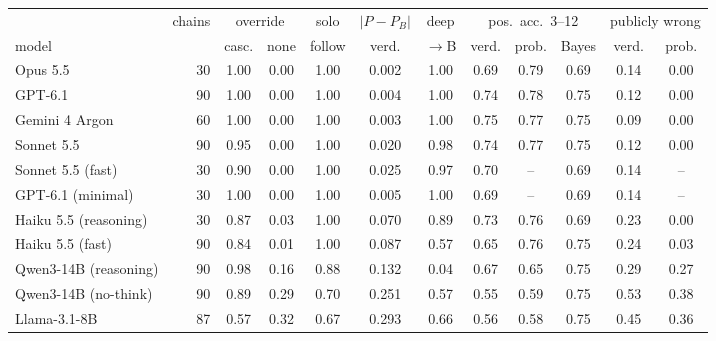\begin{tabular}{lrcccccccccc}
\toprule
 & chains & \multicolumn{2}{c}{override} & solo & $|P-P_B|$ & deep & \multicolumn{3}{c}{pos.\ acc.\ 3--12} & \multicolumn{2}{c}{publicly wrong} \\
\cmidrule(lr){3-4}\cmidrule(lr){8-10}\cmidrule(lr){11-12}
model & & casc. & none & follow & verd. & $\to$B & verd. & prob. & Bayes & verd. & prob. \\
\midrule
Opus 5.5 & 30 & 1.00 & 0.00 & 1.00 & 0.002 & 1.00 & 0.69 & 0.79 & 0.69 & 0.14 & 0.00 \\
GPT-6.1 & 90 & 1.00 & 0.00 & 1.00 & 0.004 & 1.00 & 0.74 & 0.78 & 0.75 & 0.12 & 0.00 \\
Gemini 4 Argon & 60 & 1.00 & 0.00 & 1.00 & 0.003 & 1.00 & 0.75 & 0.77 & 0.75 & 0.09 & 0.00 \\
Sonnet 5.5 & 90 & 0.95 & 0.00 & 1.00 & 0.020 & 0.98 & 0.74 & 0.77 & 0.75 & 0.12 & 0.00 \\
Sonnet 5.5 (fast) & 30 & 0.90 & 0.00 & 1.00 & 0.025 & 0.97 & 0.70 & -- & 0.69 & 0.14 & -- \\
GPT-6.1 (minimal) & 30 & 1.00 & 0.00 & 1.00 & 0.005 & 1.00 & 0.69 & -- & 0.69 & 0.14 & -- \\
Haiku 5.5 (reasoning) & 30 & 0.87 & 0.03 & 1.00 & 0.070 & 0.89 & 0.73 & 0.76 & 0.69 & 0.23 & 0.00 \\
Haiku 5.5 (fast) & 90 & 0.84 & 0.01 & 1.00 & 0.087 & 0.57 & 0.65 & 0.76 & 0.75 & 0.24 & 0.03 \\
Qwen3-14B (reasoning) & 90 & 0.98 & 0.16 & 0.88 & 0.132 & 0.04 & 0.67 & 0.65 & 0.75 & 0.29 & 0.27 \\
Qwen3-14B (no-think) & 90 & 0.89 & 0.29 & 0.70 & 0.251 & 0.57 & 0.55 & 0.59 & 0.75 & 0.53 & 0.38 \\
Llama-3.1-8B & 87 & 0.57 & 0.32 & 0.67 & 0.293 & 0.66 & 0.56 & 0.58 & 0.75 & 0.45 & 0.36 \\
\bottomrule
\end{tabular}
